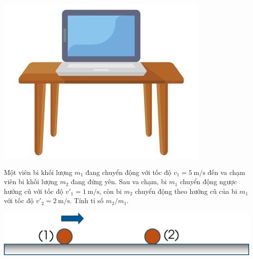 \begin{ex}
	{\includegraphics[scale=0.5]{figs/G10-BAI10-12}}
	\loigiai{}
\end{ex}
\begin{ex}
	Một viên bi khối lượng $m_1$ đang chuyển động với tốc độ $v_1=\SI{5}{\meter/\second}$ đến va chạm viên bi khối lượng $m_2$ đang đứng yên. Sau va chạm, bi $m_1$ chuyển động ngược hướng cũ với tốc độ $v'_1=\SI{1}{\meter/\second}$, còn bi $m_2$ chuyển động theo hướng cũ của bi $m_1$ với tốc độ $v'_2=\SI{2}{\meter/\second}$. Tính tỉ số $m_2/m_1$.
	\begin{center}
		\includegraphics[scale=0.5]{figs/G10-BAI10-13}
	\end{center}
	\loigiai{}
\end{ex}
